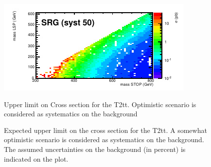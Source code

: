 \begin{figure}[hbt]
\begin{center}
        \includegraphics[width=0.5\linewidth]{plots/stopPlot/masses_SRG_xsecO.pdf}%
    \caption{Upper limit on Cross section for the T2tt. Optimistic scenario is considered as systematics on the background}
\label{fig:SigEff}
    \caption{Expected upper limit on the cross section for the
      T2tt. A somewhat optimistic scenario is considered as systematics on the
      background. The assumed uncertainties on the background (in percent) is indicated on the plot.}
\label{fig:limO}
      \end{center}
\end{figure}

